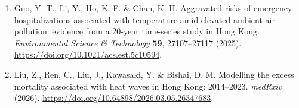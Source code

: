 \documentclass[11pt,a4paper]{article}
\begin{document}
\begin{enumerate}[label=\arabic*.,leftmargin=1.8em,itemsep=0.45em]
\item Guo, Y. T., Li, Y., Ho, K.-F. \& Chan, K. H. Aggravated risks of emergency hospitalizations associated with temperature amid elevated ambient air pollution: evidence from a 20-year time-series study in Hong Kong. \emph{Environmental Science \& Technology} \textbf{59}, 27107--27117 (2025). \url{https://doi.org/10.1021/acs.est.5c10594}.
\item Liu, Z., Ren, C., Liu, J., Kawasaki, Y. \& Bishai, D. M. Modelling the excess mortality associated with heat waves in Hong Kong: 2014--2023. \emph{medRxiv} (2026). \url{https://doi.org/10.64898/2026.03.05.26347683}.
\end{enumerate}
\end{document}
